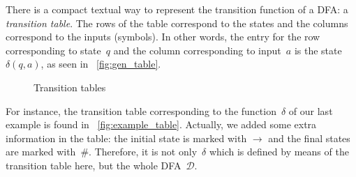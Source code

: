 There is a compact textual way to represent the transition function of
a DFA: a \emph{transition table}. The rows of the table correspond to
the states and the columns correspond to the inputs (symbols). In
other words, the entry for the row corresponding to state~\(q\) and
the column corresponding to input~\(a\) is the state~\(\delta (q,
a)\), as seen in \fig~\ref{fig:gen_table}.
\begin{figure}
\centering
{}
\qquad
{}
\caption{Transition tables}
\end{figure}
For instance, the transition table corresponding to the
function~\(\delta\) of our last example is found in
\fig~\vref{fig:example_table}. Actually, we added some extra
information in the table: the initial state is marked with
\(\rightarrow\) and the final states are marked
with~\(\#\). Therefore, it is not only~\(\delta\) which is defined by
means of the transition table here, but the whole DFA~\(\mathcal{D}\).


